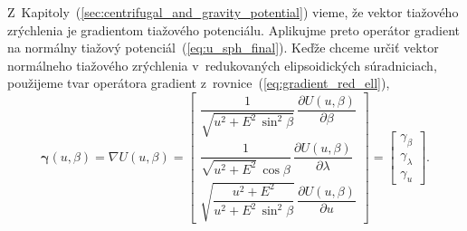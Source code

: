 \documentclass[a4paper,12pt]{book}
\begin{document}
Z~Kapitoly~(\ref{sec:centrifugal_and_gravity_potential}) vieme, že vektor 
tiažového zrýchlenia je gradientom tiažového potenciálu.  Aplikujme preto 
operátor gradient na normálny tiažový potenciál~(\ref{eq:u_sph_final}).  Keďže 
chceme určiť vektor normálneho tiažového zrýchlenia v~redukovaných 
elipsoidických súradniciach, použijeme tvar operátora gradient 
z~rovnice~(\ref{eq:gradient_red_ell}),
%
\begin{equation}
\label{eq:gamma_vec_general}
\boldsymbol \gamma(u, \beta) = \nabla U(u, \beta) =
%
\begin{bmatrix}
\dfrac{1}{\sqrt{u^2 + E^2 \, \sin^2\beta}} \, \dfrac{\partial U(u, 
\beta)}{\partial \beta}\\[2ex]
\dfrac{1}{\sqrt{u^2 + E^2} \, \cos\beta} \, \dfrac{\partial U(u, 
\beta)}{\partial \lambda}\\[2ex]
\sqrt{\dfrac{u^2 + E^2}{u^2 + E^2 \, \sin^2\beta}} \, \dfrac{\partial U(u, 
\beta)}{\partial u}
\end{bmatrix}
%
=
%
\begin{bmatrix}
\gamma_\beta\\
\gamma_\lambda\\
\gamma_u
\end{bmatrix}
%
{.}
\end{equation}
\end{document}
